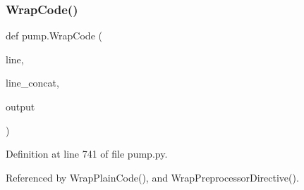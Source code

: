 \subsubsection{\texorpdfstring{Wrap\+Code()}{WrapCode()}}
{\footnotesize\ttfamily def pump.\+Wrap\+Code (\begin{DoxyParamCaption}\item[{}]{line,  }\item[{}]{line\+\_\+concat,  }\item[{}]{output }\end{DoxyParamCaption})}



Definition at line 741 of file pump.\+py.



Referenced by Wrap\+Plain\+Code(), and Wrap\+Preprocessor\+Directive().



